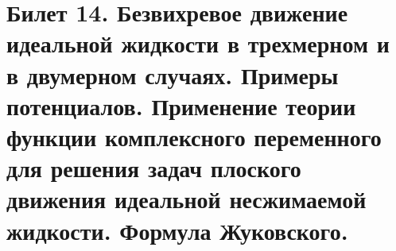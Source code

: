 \newpage
\section{Билет 14. Безвихревое движение идеальной жидкости в трехмерном и в двумерном случаях. Примеры потенциалов. Применение теории функции комплексного переменного для решения задач плоского движения идеальной несжимаемой жидкости. Формула Жуковского.}